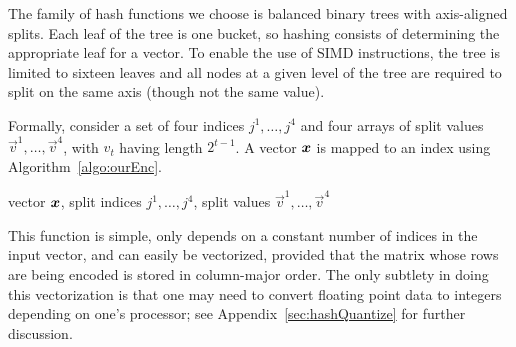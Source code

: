 The family of hash functions we choose is balanced binary trees with axis-aligned splits. Each leaf of the tree is one bucket, so hashing consists of determining the appropriate leaf for a vector. To enable the use of SIMD instructions, the tree is limited to sixteen leaves and all nodes at a given level of the tree are required to split on the same axis (though not the same value).


Formally, consider a set of four indices ${j^1,\ldots,j^4}$ and four arrays of split values $\vec{v}^1,\ldots,\vec{v}^4$, with $v_t$ having length $2^{t-1}$. A vector $\bm{x}$ is mapped to an index using Algorithm~\ref{algo:ourEnc}.
\begin{algorithm}[h]
\caption{\oursHash} \label{algo:ourEnc}
\begin{algorithmic}[1]
     vector $\bm{x}$, split indices ${j^1,\ldots,j^4}$, split values $\vec{v}^1,\ldots,\vec{v}^4$
      
       
      
     
    \ENDFOR
\end{algorithmic}
\end{algorithm}

This function is simple, only depends on a constant number of indices in the input vector, and can easily be vectorized, provided that the matrix whose rows are being encoded is stored in column-major order. The only subtlety in doing this vectorization is that one may need to convert floating point data to integers depending on one's processor; see Appendix~\ref{sec:hashQuantize} for further discussion.

